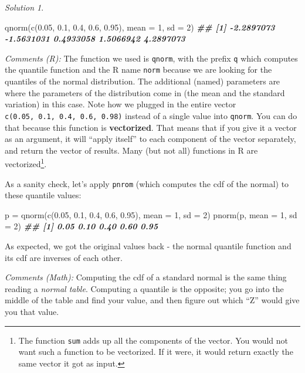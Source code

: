 \documentclass[
]{book}
\newenvironment{Shaded}{\begin{snugshade}}{\end{snugshade}}
\newcommand{\AttributeTok}[1]{\textcolor[rgb]{0.77,0.63,0.00}{#1}}
\newcommand{\DecValTok}[1]{\textcolor[rgb]{0.00,0.00,0.81}{#1}}
\newcommand{\DocumentationTok}[1]{\textcolor[rgb]{0.56,0.35,0.01}{\textbf{\textit{#1}}}}
\newcommand{\FloatTok}[1]{\textcolor[rgb]{0.00,0.00,0.81}{#1}}
\newcommand{\FunctionTok}[1]{\textcolor[rgb]{0.00,0.00,0.00}{#1}}
\newcommand{\NormalTok}[1]{#1}
\newcommand{\OtherTok}[1]{\textcolor[rgb]{0.56,0.35,0.01}{#1}}
\theoremstyle{definition}
\theoremstyle{definition}
\theoremstyle{definition}
\theoremstyle{definition}
\theoremstyle{remark}
\newtheorem*{solution}{Solution}
\begin{document}
\begin{solution}
~

\begin{Shaded}
\begin{Highlighting}[]
\FunctionTok{qnorm}\NormalTok{(}\FunctionTok{c}\NormalTok{(}\FloatTok{0.05}\NormalTok{, }\FloatTok{0.1}\NormalTok{, }\FloatTok{0.4}\NormalTok{, }\FloatTok{0.6}\NormalTok{, }\FloatTok{0.95}\NormalTok{), }\AttributeTok{mean =} \DecValTok{1}\NormalTok{, }\AttributeTok{sd =} \DecValTok{2}\NormalTok{)}
\DocumentationTok{\#\# [1] {-}2.2897073 {-}1.5631031  0.4933058  1.5066942  4.2897073}
\end{Highlighting}
\end{Shaded}

\emph{Comments (R):} The function we used is \texttt{qnorm}, with the prefix \texttt{q} which computes the
quantile function and the R name \texttt{norm} because we are looking for the quantiles
of the normal distribution. The additional (named) parameters are where the
parameters of the distribution come in (the mean and the standard variation) in
this case. Note how we plugged in the entire vector
\texttt{c(0.05,\ 0.1,\ 0.4,\ 0.6,\ 0.98)} instead of a single value into \texttt{qnorm}. You can
do that because this function is \textbf{vectorized}. That means that if you give it
a vector as an argument, it will ``apply itself'' to each component of the vector
separately, and return the vector of results. Many (but not all) functions in R
are vectorized\footnote{The function \texttt{sum} adds up all the components of the vector.
  You would not want such a function to be vectorized. If it were, it would return
  exactly the same vector it got as input.}.

As a sanity check, let's apply \texttt{pnrom} (which computes the cdf of the normal) to these quantile values:

\begin{Shaded}
\begin{Highlighting}[]
\NormalTok{p }\OtherTok{=} \FunctionTok{qnorm}\NormalTok{(}\FunctionTok{c}\NormalTok{(}\FloatTok{0.05}\NormalTok{, }\FloatTok{0.1}\NormalTok{, }\FloatTok{0.4}\NormalTok{, }\FloatTok{0.6}\NormalTok{, }\FloatTok{0.95}\NormalTok{), }\AttributeTok{mean =} \DecValTok{1}\NormalTok{, }\AttributeTok{sd =} \DecValTok{2}\NormalTok{)}
\FunctionTok{pnorm}\NormalTok{(p, }\AttributeTok{mean =} \DecValTok{1}\NormalTok{, }\AttributeTok{sd =} \DecValTok{2}\NormalTok{)}
\DocumentationTok{\#\# [1] 0.05 0.10 0.40 0.60 0.95}
\end{Highlighting}
\end{Shaded}

As expected, we got the original values back - the normal quantile function and its cdf are inverses of each other.

\emph{Comments (Math):} Computing the cdf of a standard normal is the same thing reading a
\emph{normal table}. Computing a quantile is the opposite; you go into the middle of
the table and find your value, and then figure out which ``Z'' would give you that
value.
\end{solution}
\end{document}
